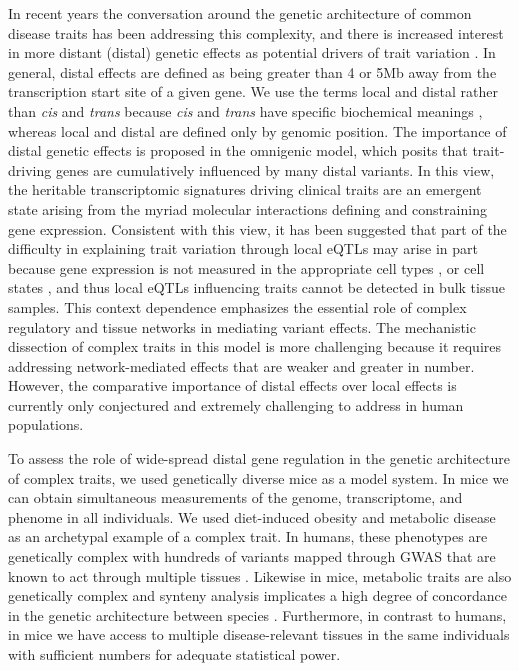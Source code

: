 \documentclass[
]{article}
\begin{document}
In recent years the conversation around the genetic architecture of
common disease traits has been addressing this complexity, and there is
increased interest in more distant (distal) genetic effects as potential
drivers of trait variation \cite{pmid37857933, 
pmid32424349, pmid32831138, pmid30950127, pmid24013639}. In general,
distal effects are defined as being greater than 4 or 5Mb away from the
transcription start site of a given gene. We use the terms local and
distal rather than \textit{cis} and \textit{trans} because \textit{cis}
and \textit{trans} have specific biochemical meanings
\cite{pmid18597885}, whereas local and distal are defined only by
genomic position. The importance of distal genetic effects is proposed
in the omnigenic model, which posits that trait-driving genes are
cumulatively influenced by many distal variants. In this view, the
heritable transcriptomic signatures driving clinical traits are an
emergent state arising from the myriad molecular interactions defining
and constraining gene expression. Consistent with this view, it has been
suggested that part of the difficulty in explaining trait variation
through local eQTLs may arise in part because gene expression is not
measured in the appropriate cell types \cite{pmid32912663}, or cell
states \cite{pmid35545678}, and thus local eQTLs influencing traits
cannot be detected in bulk tissue samples. This context dependence
emphasizes the essential role of complex regulatory and tissue networks
in mediating variant effects. The mechanistic dissection of complex
traits in this model is more challenging because it requires addressing
network-mediated effects that are weaker and greater in number. However,
the comparative importance of distal effects over local effects is
currently only conjectured and extremely challenging to address in human
populations.

To assess the role of wide-spread distal gene regulation in the genetic
architecture of complex traits, we used genetically diverse mice as a
model system. In mice we can obtain simultaneous measurements of the
genome, transcriptome, and phenome in all individuals. We used
diet-induced obesity and metabolic disease as an archetypal example of a
complex trait. In humans, these phenotypes are genetically complex with
hundreds of variants mapped through GWAS \cite{pmid36350656, 
pmid34556834} that are known to act through multiple tissues
\cite{pmid28089486, pmid10889786}. Likewise in mice, metabolic traits
are also genetically complex \cite{pmid31343992} and synteny analysis
implicates a high degree of concordance in the genetic architecture
between species \cite{pmid31343992, pmid29567659}. Furthermore, in
contrast to humans, in mice we have access to multiple disease-relevant
tissues in the same individuals with sufficient numbers for adequate
statistical power.
\end{document}
